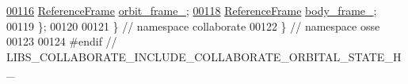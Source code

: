 \begin{DoxyCode}
\hyperlink{classosse_1_1collaborate_1_1_orbital_state_aa8a60024082bf2c299abfea13aa24f5e}{00116}   \hyperlink{classosse_1_1collaborate_1_1_reference_frame}{ReferenceFrame} \hyperlink{classosse_1_1collaborate_1_1_orbital_state_aa8a60024082bf2c299abfea13aa24f5e}{orbit\_frame\_};
\hyperlink{classosse_1_1collaborate_1_1_orbital_state_a3542ba071a7a50da3974a5766b089d58}{00118}   \hyperlink{classosse_1_1collaborate_1_1_reference_frame}{ReferenceFrame} \hyperlink{classosse_1_1collaborate_1_1_orbital_state_a3542ba071a7a50da3974a5766b089d58}{body\_frame\_};
00119 \};
00120 
00121 \}  \textcolor{comment}{// namespace collaborate}
00122 \}  \textcolor{comment}{// namespace osse}
00123 
00124 \textcolor{preprocessor}{#endif  // LIBS\_COLLABORATE\_INCLUDE\_COLLABORATE\_ORBITAL\_STATE\_H\_}
\end{DoxyCode}
